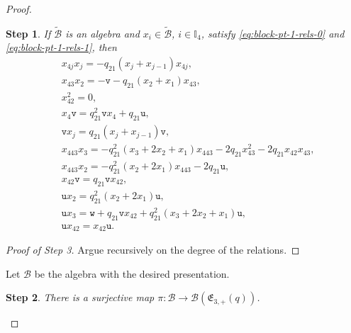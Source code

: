 \documentclass[10pt,a4paper]{amsart}
\numberwithin{equation}{section}
\newtheorem{step}{Step}
\newcommand{\toba}{\mathscr B}
\newcommand{\wtoba}{\widetilde{\mathscr B}}
\newcommand{\I}{{\mathbb I}}
\newcommand{\ut}{\mathtt{u}}
\newcommand{\vt}{\mathtt{v}}
\newcommand{\wt}{\mathtt{w}}
\newcommand{\eny}{\mathfrak{E}}
\begin{document}
\begin{proof}
\begin{step}\label{lem:block-pt-1-rels}
If $\wtoba$
is an algebra and $x_i\in\wtoba$, $i\in\I_4$, satisfy \eqref{eq:block-pt-1-rels-0} and \eqref{eq:block-pt-1-rels-1},
then
\begin{align}\label{eq:block-pt-1-rels-others-1}
& x_{4j}x_j=-q_{21}(x_j+x_{j-1})x_{4j},
\\\label{eq:block-pt-1-rels-others-2}
& x_{43}x_2=-\vt-q_{21}(x_2+x_1)x_{43},
\\ \label{eq:block-pt-1-rels-others-prv1}
& x_{42}^2=0,
\\\label{eq:block-pt-1-rels-others-3}
& x_4\vt=q_{21}^2\vt x_4+q_{21}\ut,
\\\label{eq:block-pt-1-rels-others-4}
& \vt x_j=q_{21}(x_j+x_{j-1})\vt,
\\\label{eq:block-pt-1-rels-others-5}
& x_{443}x_3 = -q_{21}^2(x_3+2x_2+x_1)x_{443}-2q_{21}x_{43}^2-2q_{21}x_{42}x_{43},
\\\label{eq:block-pt-1-rels-others-6}
& x_{443}x_2 = -q_{21}^2(x_2+2x_1)x_{443}-2q_{21}\ut,
\\\label{eq:block-pt-1-rels-others-7}
& x_{42}\vt = q_{21}\vt x_{42},
\\\label{eq:block-pt-1-rels-others-8}
& \ut x_2 =q_{21}^2(x_2+2x_1)\ut,
\\\label{eq:block-pt-1-rels-others-9}
&\ut x_3 = \wt+q_{21}\vt x_{42}+q_{21}^2(x_3+2x_2+x_1)\ut,
\\\label{eq:block-pt-1-rels-others-10}
& \ut x_{42} = x_{42}\ut.
\end{align}
\end{step}

\begin{proof}[Proof of Step 3]
Argue recursively on the degree of the relations.
\end{proof}

Let $\toba$ be the algebra with the desired presentation.

\begin{step}%
There is a surjective map $\pi\colon \toba \to \toba(\eny_{3,+}(q))$.
\end{step}


\end{proof}
\end{document}

